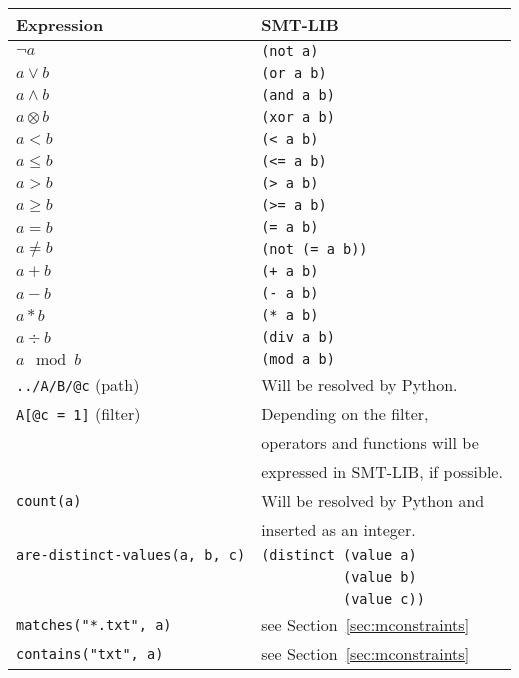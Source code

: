 \documentclass[12pt,swedish,english]{report}
\theoremstyle{definition}
\begin{document}
\begin{appendices}
 \begin{center}
 \begin{longtable}{|l|l|}
 \hline
 \textbf{Expression} & \textbf{SMT-LIB} \\
 \hline
 $\neg a$ & \verb|(not a)| \\ \hline
 $a \vee b$ & \verb|(or a b)|\\ \hline
 $a \wedge b$ & \verb|(and a b)| \\ \hline
 $a \otimes b$ & \verb|(xor a b)| \\ \hline
 $a < b$ & \verb|(< a b)|\\ \hline
 $a \leq b$ & \verb|(<= a b)|\\ \hline
 $a > b$ & \verb|(> a b)| \\ \hline
 $a \geq b$ & \verb|(>= a b)| \\ \hline
 $a = b$ & \verb|(= a b)| \\ \hline
 $a \neq b$ & \verb|(not (= a b))| \\ \hline
 $a + b$ & \verb|(+ a b)|\\ \hline
 $a - b$ & \verb|(- a b)|\\ \hline
 $a * b$ & \verb|(* a b)|\\ \hline
 $a \div b$ & \verb|(div a b)| \\ \hline
 $a \mod b$ & \verb|(mod a b)| \\ \hline
 \verb|../A/B/@c| (path)& Will be resolved by Python. \\ \hline
 
 \verb|A[@c = 1]| (filter) &  Depending on the filter,\\
 & operators and functions will be \\
 & expressed in SMT-LIB, if possible. \\ \hline
 
 \verb|count(a)| & Will be resolved by Python and \\
 & inserted as an integer. \\ \hline
 
 \verb|are-distinct-values(a, b, c)| 
 & \verb|(distinct (value a)|\\
 & \verb|          (value b)|\\ & \verb|          (value c))| \\ \hline
 
 \verb|matches("*.txt", a)| & see Section~\ref{sec:mconstraints} \\ \hline
 
 \verb|contains("txt", a)| & see Section~\ref{sec:mconstraints} \\ \hline
 

\end{longtable}
\end{center}
\end{appendices}
\end{document}
